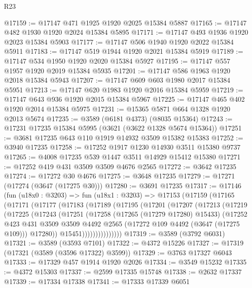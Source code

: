 \begin{lexlean}{R23}
\begin{coremodule}
@17159 := @17147 @471 @1925 @1920 @2025 @15384 @5887
@17165 := @17147 @482 @1930 @1920 @2024 @15384 @5895
@17171 := @17147 @493 @1936 @1920 @2023 @15384 @5903
@17177 := @17147 @506 @1940 @1920 @2022 @15384 @5911
@17183 := @17147 @519 @1944 @1920 @2021 @15384 @5919
@17189 := @17147 @534 @1950 @1920 @2020 @15384 @5927
@17195 := @17147 @557 @1957 @1920 @2019 @15384 @5935
@17201 := @17147 @586 @1963 @1920 @2018 @15384 @5943
@17207 := @17147 @609 @603 @1980 @2017 @15384 @5951
@17213 := @17147 @620 @1983 @1920 @2016 @15384 @5959
@17219 := @17147 @643 @936 @1920 @2015 @15384 @5967
@17225 := @17147 @465 @402 @1920 @2014 @15384 @5975
@17231 := @15365 @5871 @664 @1328 @1920 @2013 @5674
@17235 := @3589 (@6181 @4373) (@8035 @15364)
@17243 := @17231 @17235 @15384 @5995 (@3621 (@3622 @1328 @5674 @15364))
@17251 := @3681 @17235 @643 @110 @1919 @14932 @3509 @15382 @15383
@17252 := @3940 @17235
@17258 := @17252 @1917 @1230 @14930 @3511 @15380 @9737
@17265 := @4008 @17235 @539 @1447 @3511 @14929 @15412 @15380
@17271 := @17252 @419 @431 @3509 @3509 @4676 @2565
@17272 := @3642 @17235
@17274 := @17272 @30 @4676
@17275 := @3648 @17235
@17279 := @17271 (@17274 (@3647 (@17275 @30)))
@17280 := @3691 @17235
@17317 := @17146
    (fun (u18x0 : @3203) =>
    fun (u18x1 : @3203) =>
    @17153
      (@17159
        (@17165
          (@17171
            (@17177
              (@17183
                (@17189
                  (@17195
                    (@17201
                      (@17207
                        (@17213
                          (@17219
                            (@17225
                              (@17243
                                (@17251
                                  (@17258
                                    (@17265 (@17279 @17280) @15433)
                                    (@17252
                                      @423
                                      @431
                                      @3509
                                      @3509
                                      @4492
                                      @2565
                                      (@17272 @109 @4492 (@3647 (@17275 @109)))
                                      @17280))
                                  @15451)))))))))))))))
@17319 := @3589 (@3792 @6031)
@17321 := @3589 (@3593 @7101)
@17322 := @4372 @15226
@17327 := @17319 (@17321 (@3589 (@3596 @17322) @3599))
@17329 := @3763 @17327 @6043
@17333 := @17329 @457 @1914 @1920 @2026
@17334 := @3549 @15232
@17335 := @4372 @15303
@17337 := @2599 @17335 @15748
@17338 := @2632 @17337
@17339 := @17334 @17338
@17341 := @17333 @17339 @6051

\end{coremodule}
\end{lexlean}
